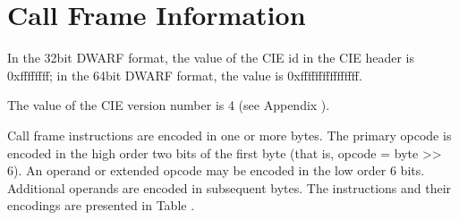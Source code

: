 \section{Call Frame Information}
\label{datarep:callframeinformation}

In the 32\dash bit DWARF format, the value of the CIE id in the
CIE header is 0xffffffff; in the 64\dash bit DWARF format, the
value is 0xffffffffffffffff.

The value of the CIE version number is 4 
(see Appendix ). 

Call frame instructions are encoded in one or more bytes. The
primary opcode is encoded in the high order two bits of
the first byte (that is, opcode = byte >> 6). An operand
or extended opcode may be encoded in the low order 6
bits. Additional operands are encoded in subsequent bytes.
The instructions and their encodings are presented in
Table .


